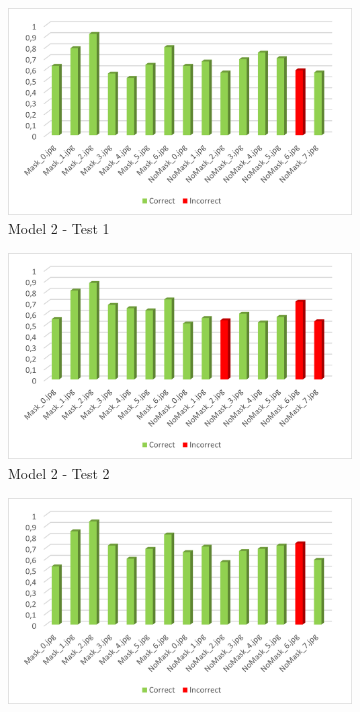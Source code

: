 \documentclass[a4paper,12pt]{article}
\begin{document}
\begin{figure}%
    \centering
    \begin{subfigure}{6cm}
        \includegraphics[width=\linewidth]{images_latex/test2_1.png}
        \caption{Model 2 - Test 1}
        \label{fig:t2_1}
    \end{subfigure}
    \qquad
    \begin{subfigure}{6cm}
        \includegraphics[width=\linewidth]{images_latex/test2_2.png}
        \caption{ Model 2 - Test 2}
    \end{subfigure}
    \qquad
    \begin{subfigure}{6cm}
        \includegraphics[width=\linewidth]{images_latex/test2_3.png}

\end{subfigure}
\end{figure}
\end{document}
